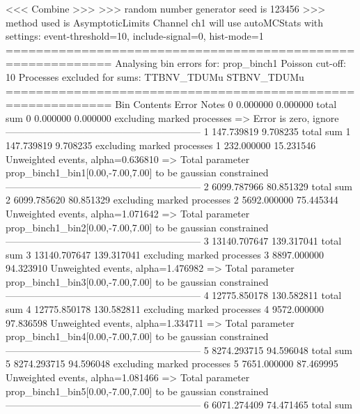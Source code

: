  <<< Combine >>> 
>>> random number generator seed is 123456
>>> method used is AsymptoticLimits
Channel ch1 will use autoMCStats with settings: event-threshold=10, include-signal=0, hist-mode=1
============================================================
Analysing bin errors for: prop_binch1
Poisson cut-off: 10
Processes excluded for sums: TTBNV_TDUMu STBNV_TDUMu
============================================================
Bin        Contents        Error           Notes                         
0          0.000000        0.000000        total sum                     
0          0.000000        0.000000        excluding marked processes    
  => Error is zero, ignore      
------------------------------------------------------------
1          147.739819      9.708235        total sum                     
1          147.739819      9.708235        excluding marked processes    
1          232.000000      15.231546       Unweighted events, alpha=0.636810
  => Total parameter prop_binch1_bin1[0.00,-7.00,7.00] to be gaussian constrained
------------------------------------------------------------
2          6099.787966     80.851329       total sum                     
2          6099.785620     80.851329       excluding marked processes    
2          5692.000000     75.445344       Unweighted events, alpha=1.071642
  => Total parameter prop_binch1_bin2[0.00,-7.00,7.00] to be gaussian constrained
------------------------------------------------------------
3          13140.707647    139.317041      total sum                     
3          13140.707647    139.317041      excluding marked processes    
3          8897.000000     94.323910       Unweighted events, alpha=1.476982
  => Total parameter prop_binch1_bin3[0.00,-7.00,7.00] to be gaussian constrained
------------------------------------------------------------
4          12775.850178    130.582811      total sum                     
4          12775.850178    130.582811      excluding marked processes    
4          9572.000000     97.836598       Unweighted events, alpha=1.334711
  => Total parameter prop_binch1_bin4[0.00,-7.00,7.00] to be gaussian constrained
------------------------------------------------------------
5          8274.293715     94.596048       total sum                     
5          8274.293715     94.596048       excluding marked processes    
5          7651.000000     87.469995       Unweighted events, alpha=1.081466
  => Total parameter prop_binch1_bin5[0.00,-7.00,7.00] to be gaussian constrained
------------------------------------------------------------
6          6071.274409     74.471465       total sum                     
